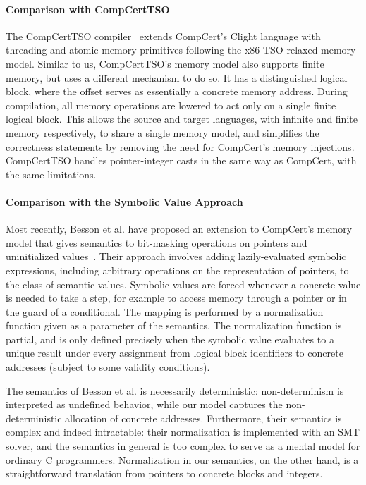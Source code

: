 \paragraph{Comparison with CompCertTSO}
The CompCertTSO compiler~\cite{vsevvcik2013compcerttso} extends CompCert's
Clight language with threading and atomic memory primitives following the
x86-TSO relaxed memory model. Similar to us, CompCertTSO's memory model 
also supports finite memory, but uses a different mechanism to do so.
It has a distinguished logical block, where the offset serves as essentially a
concrete memory address. 
During compilation, all memory operations are
lowered to act only on a single finite logical block. This allows the source
and target languages, with infinite and finite memory respectively, to share a
single memory model, and simplifies the correctness statements by removing
the need for CompCert's memory injections. 
CompCertTSO handles pointer-integer casts in the same way as CompCert, with the same limitations.

\paragraph{Comparison with the Symbolic Value Approach}
Most recently, Besson et al. have proposed an extension to CompCert's
memory model that gives semantics to bit-masking operations on
pointers and uninitialized values~\cite{besson2014precise}. Their
approach involves adding lazily-evaluated symbolic expressions,
including arbitrary operations on the representation of pointers, to
the class of semantic values. Symbolic values are forced whenever a
concrete value is needed to take a step, for example to access memory
through a pointer or in the guard of a conditional. The mapping is
performed by a normalization function given as a parameter of the
semantics. The normalization function is partial, and is only defined
precisely when the symbolic value evaluates to a unique result under
every assignment from logical block identifiers to concrete addresses
(subject to some validity conditions).

The semantics of Besson et al. is necessarily deterministic: non-determinism is
interpreted as undefined behavior, while our model
captures the non-deterministic allocation of concrete addresses.
Furthermore, their semantics is complex and indeed intractable: their
normalization is implemented with an SMT solver, and the semantics in general is too complex to serve as a mental model for ordinary C programmers. Normalization in our semantics,
on the other hand, is a straightforward translation from
pointers to concrete blocks and integers.

